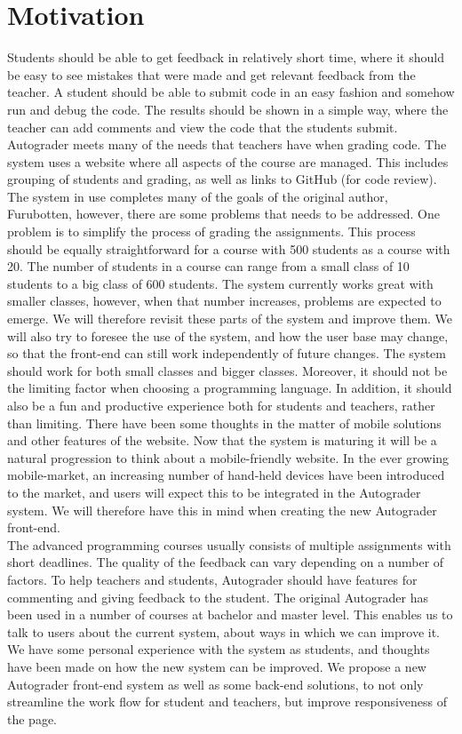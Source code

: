 \chapter*{Motivation}
Students should be able to get feedback in relatively short time, where it should be easy to see mistakes that were made and get relevant feedback from the teacher. A student should be able to submit code in an easy fashion and somehow run and debug the code. The results should be shown in a simple way, where the teacher can add comments and view the code that the students submit. Autograder meets many of the needs that teachers have when grading code. The system uses a website where all aspects of the course are managed. This includes grouping of students and grading, as well as links to GitHub (for code review). \\The system in use completes many of the goals of the original author, Furubotten, however, there are some problems that needs to be addressed. One problem is to simplify the process of grading the assignments. This process should be equally straightforward for a course with 500 students as a course with 20. The number of students in a course can range from a small class of 10 students to a big class of 600 students. The system currently works great with smaller classes, however, when that number increases, problems are expected to emerge. We will therefore revisit these parts of the system and improve them. We will also try to foresee the use of the system, and how the user base may change, so that the front-end can still work independently of future changes. The system should work for both small classes and bigger classes. Moreover, it should not be the limiting factor when choosing a programming language. In addition, it should also be a fun and productive experience both for students and teachers, rather than limiting. There have been some thoughts in the matter of mobile solutions and other features of the website. Now that the system is maturing it will be a natural progression to think about a mobile-friendly website. In the ever growing mobile-market, an increasing number of hand-held devices have been introduced to the market, and users will expect this to be integrated in the Autograder system. We will therefore have this in mind when creating the new Autograder front-end.\\The advanced programming courses usually consists of multiple assignments with short deadlines. The quality of the feedback can vary depending on a number of factors. To help teachers and students, Autograder should have features for commenting and giving feedback to the student. The original Autograder has been used in a number of courses at bachelor and master level. This enables us to talk to users about the current system, about ways in which we can improve it. We have some personal experience with the system as students, and thoughts have been made on how the new system can be improved. We propose a new Autograder front-end system as well as some back-end solutions, to not only streamline the work flow for student and teachers, but improve responsiveness of the page.
